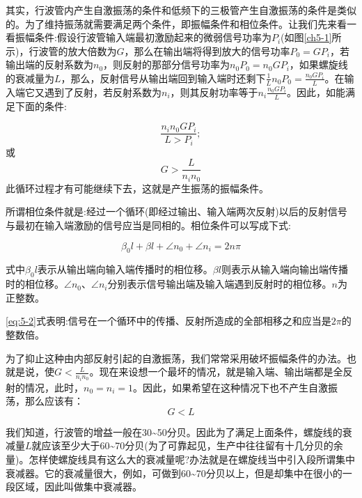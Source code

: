 其实，行波管内产生自激振荡的条件和低频下的三极管产生自激振荡的条件是类似的。为了维持振荡就需要满足两个条件，即振幅条件和相位条件。让我们先来看一看振幅条件:假设行波管输入端最初激励起来的微弱信号功率为$ P_i $(如图\ref{ch5-1}所示)，行波管的放大倍数为$ G $，那么在输出端将得到放大的信号功率$ P_0 = GP_i $，若输出端的反射系数为$ n_0 $，则反射的那部分信号功率为$ n_0P_0 = n_0GP_i $，如果螺旋线的衰减量为$ L $，那么，反射信号从输出端回到输入端时还剩下$ \frac{1}{L} n_0P_0 = \frac{n_0GP_i}{L}$。在输入端它又遇到了反射，若反射系数为$ n_i $，则其反射功率等于$ n_i\frac{n_0GP_i}{L} $。因此，如能满足下面的条件:

\begin{equation*}
	\frac{n_in_0GP_i}{L > P_i};
\end{equation*}
或\begin{equation} \label{eq:5-1}
	 G > \frac{L}{n_in_0}
\end{equation}
此循环过程才有可能继续下去，这就是产生振荡的振幅条件。

所谓相位条件就是:经过一个循环(即经过输出、输入端两次反射)以后的反射信号与最初在输入端激励的信号应当是同相的。相位条件可以写成下式:

\begin{equation} \label{eq:5-2}
	\beta_0 l +\beta l + \angle n_0 + \angle n_i = 2n\pi
\end{equation}

式中$ \beta_0 l $表示从输出端向输入端传播时的相位移。$ \beta l $则表示从输入端向输出端传播时的相位移。$ \angle n_0 $、$ \angle n_i $分别表示信号输出端及输入端遇到反射时的相位移。$ n $为正整数。


\eqref{eq:5-2}式表明:信号在一个循环中的传播、反射所造成的全部相移之和应当是$ 2\pi $的整数倍。


为了抑止这种由内部反射引起的自激振荡，我们常常采用破坏振幅条件的办法。也就是说，使$ G < \frac{L}{n_in_0} $。现在来设想一个最坏的情况，就是输入端、输出端都是全反射的情况，此时，$ n_0 = n_i = 1 $。因此，如果希望在这种情况下也不产生自激振荡，那么应该有：
\begin{equation} \label{eq:5-3}
	G < L
\end{equation}


我们知道，行波管的增益一般在30\textasciitilde50分贝。因此为了满足上面条件，螺旋线的衰减量$ L $就应该至少大于60\textasciitilde70分贝(为了可靠起见，生产中往往留有十几分贝的余量)。怎样使螺旋线具有这么大的衰减量呢?办法就是在螺旋线当中引入段所谓集中衰减器。它的衰减量很大，例如，可做到60\textasciitilde70分贝以上，但是却集中在很小的一段区域，因此叫做集中衰减器。



